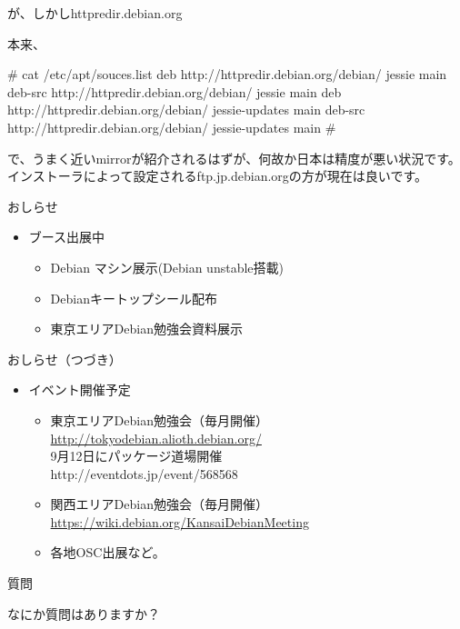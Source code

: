 \begin{frame}[containsverbatim]{が、しかしhttpredir.debian.org}

  本来、
  \begin{commandlinesmall}
# cat /etc/apt/souces.list
deb http://httpredir.debian.org/debian/ jessie main
deb-src http://httpredir.debian.org/debian/ jessie main
deb http://httpredir.debian.org/debian/ jessie-updates main
deb-src http://httpredir.debian.org/debian/ jessie-updates main
#
  \end{commandlinesmall}
で、うまく近いmirrorが紹介されるはずが、何故か日本は精度が悪い状況です。インストーラによって設定されるftp.jp.debian.orgの方が現在は良いです。
    
\end{frame}

\begin{frame}{おしらせ}
\begin{itemize}
\item ブース出展中
\begin{itemize}
\item Debian マシン展示(Debian unstable搭載)
\item Debianキートップシール配布
\item 東京エリアDebian勉強会資料展示
\end{itemize}
\end{itemize}

\end{frame}

\begin{frame}{おしらせ（つづき）}
\begin{itemize}
\item イベント開催予定
\begin{itemize}
\item 東京エリアDebian勉強会（毎月開催）\\
  \url{http://tokyodebian.alioth.debian.org/}\\
  9月12日にパッケージ道場開催\\
  http://eventdots.jp/event/568568
\item 関西エリアDebian勉強会（毎月開催）\\
  \url{https://wiki.debian.org/KansaiDebianMeeting}
\item 各地OSC出展など。
\end{itemize}  
\end{itemize}
\end{frame}

\begin{frame}{質問}

\begin{center}
なにか質問はありますか？
\end{center}

\end{frame}




